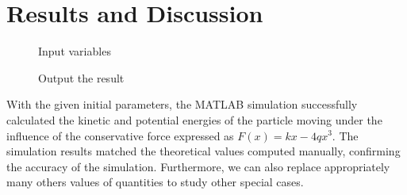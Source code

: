 \documentclass[13pt,a4paper]{report}
\begin{document}
\section{Results and Discussion}
\begin{figure}[!htb]
    \centering
    \begin{minipage}{.375\textwidth}
        \centering
        \caption{Input variables}
        \label{fig:input}
    \end{minipage}%
    \begin{minipage}{0.625\textwidth}
        \centering
        \caption{Output the result}
        \label{fig:output}
    \end{minipage}
\end{figure}

With the given initial parameters, the MATLAB simulation successfully calculated the kinetic and potential energies of the particle moving under the influence of the conservative force expressed as $F(x) = kx - 4qx^3$. The simulation results matched the theoretical values computed manually, confirming the accuracy of the simulation. Furthermore, we can also replace appropriately many others values of quantities to study other special cases.
\end{document}
